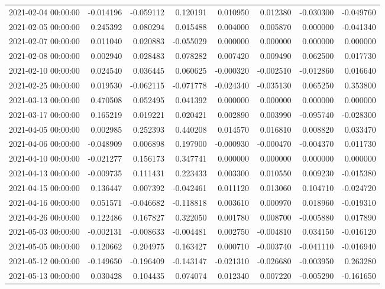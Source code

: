 \begin{tabular}{lrrrrrrr}
2021-02-04 00:00:00 & -0.014196 & -0.059112 & 0.120191 & 0.010950 & 0.012380 & -0.030300 & -0.049760 \\
2021-02-05 00:00:00 & 0.245392 & 0.080294 & 0.015488 & 0.004000 & 0.005870 & 0.000000 & -0.041340 \\
2021-02-07 00:00:00 & 0.011040 & 0.020883 & -0.055029 & 0.000000 & 0.000000 & 0.000000 & 0.000000 \\
2021-02-08 00:00:00 & 0.002940 & 0.028483 & 0.078282 & 0.007420 & 0.009490 & 0.062500 & 0.017730 \\
2021-02-10 00:00:00 & 0.024540 & 0.036445 & 0.060625 & -0.000320 & -0.002510 & -0.012860 & 0.016640 \\
2021-02-25 00:00:00 & 0.019530 & -0.062115 & -0.071778 & -0.024340 & -0.035130 & 0.065250 & 0.353800 \\
2021-03-13 00:00:00 & 0.470508 & 0.052495 & 0.041392 & 0.000000 & 0.000000 & 0.000000 & 0.000000 \\
2021-03-17 00:00:00 & 0.165219 & 0.019221 & 0.020421 & 0.002890 & 0.003990 & -0.095740 & -0.028300 \\
2021-04-05 00:00:00 & 0.002985 & 0.252393 & 0.440208 & 0.014570 & 0.016810 & 0.008820 & 0.033470 \\
2021-04-06 00:00:00 & -0.048909 & 0.006898 & 0.197900 & -0.000930 & -0.000470 & -0.004370 & 0.011730 \\
2021-04-10 00:00:00 & -0.021277 & 0.156173 & 0.347741 & 0.000000 & 0.000000 & 0.000000 & 0.000000 \\
2021-04-13 00:00:00 & -0.009735 & 0.111431 & 0.223433 & 0.003300 & 0.010550 & 0.009230 & -0.015380 \\
2021-04-15 00:00:00 & 0.136447 & 0.007392 & -0.042461 & 0.011120 & 0.013060 & 0.104710 & -0.024720 \\
2021-04-16 00:00:00 & 0.051571 & -0.046682 & -0.118818 & 0.003610 & 0.000970 & 0.018960 & -0.019310 \\
2021-04-26 00:00:00 & 0.122486 & 0.167827 & 0.322050 & 0.001780 & 0.008700 & -0.005880 & 0.017890 \\
2021-05-03 00:00:00 & -0.002131 & -0.008633 & -0.004481 & 0.002750 & -0.004810 & 0.034150 & -0.016120 \\
2021-05-05 00:00:00 & 0.120662 & 0.204975 & 0.163427 & 0.000710 & -0.003740 & -0.041110 & -0.016940 \\
2021-05-12 00:00:00 & -0.149650 & -0.196409 & -0.143147 & -0.021310 & -0.026680 & -0.003950 & 0.263280 \\
2021-05-13 00:00:00 & 0.030428 & 0.104435 & 0.074074 & 0.012340 & 0.007220 & -0.005290 & -0.161650 \\

\end{tabular}
